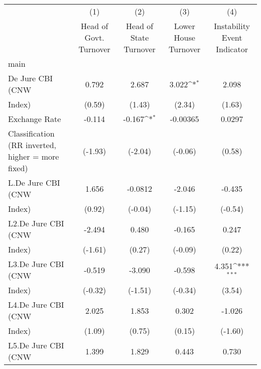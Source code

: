 {
\def\sym#1{\ifmmode^{#1}\else\(^{#1}\)\fi}
\begin{tabular}{l*{4}{c}}
\hline\hline
                    &\multicolumn{1}{c}{(1)}&\multicolumn{1}{c}{(2)}&\multicolumn{1}{c}{(3)}&\multicolumn{1}{c}{(4)}\\
                    &\multicolumn{1}{c}{Head of Govt. Turnover}&\multicolumn{1}{c}{Head of State Turnover}&\multicolumn{1}{c}{Lower House Turnover}&\multicolumn{1}{c}{Instability Event Indicator}\\
\hline
main                &                     &                     &                     &                     \\
De Jure CBI (CNW    &       0.792         &       2.687         &       3.022\sym{*}  &       2.098         \\
Index)              &      (0.59)         &      (1.43)         &      (2.34)         &      (1.63)         \\
[1em]
Exchange Rate       &      -0.114         &      -0.167\sym{*}  &    -0.00365         &      0.0297         \\
Classification (RR inverted, higher = more fixed)&     (-1.93)         &     (-2.04)         &     (-0.06)         &      (0.58)         \\
[1em]
L.De Jure CBI (CNW  &       1.656         &     -0.0812         &      -2.046         &      -0.435         \\
Index)              &      (0.92)         &     (-0.04)         &     (-1.15)         &     (-0.54)         \\
[1em]
L2.De Jure CBI (CNW &      -2.494         &       0.480         &      -0.165         &       0.247         \\
Index)              &     (-1.61)         &      (0.27)         &     (-0.09)         &      (0.22)         \\
[1em]
L3.De Jure CBI (CNW &      -0.519         &      -3.090         &      -0.598         &       4.351\sym{***}\\
Index)              &     (-0.32)         &     (-1.51)         &     (-0.34)         &      (3.54)         \\
[1em]
L4.De Jure CBI (CNW &       2.025         &       1.853         &       0.302         &      -1.026         \\
Index)              &      (1.09)         &      (0.75)         &      (0.15)         &     (-1.60)         \\
[1em]
L5.De Jure CBI (CNW &       1.399         &       1.829         &       0.443         &       0.730         \\

\end{tabular}}
